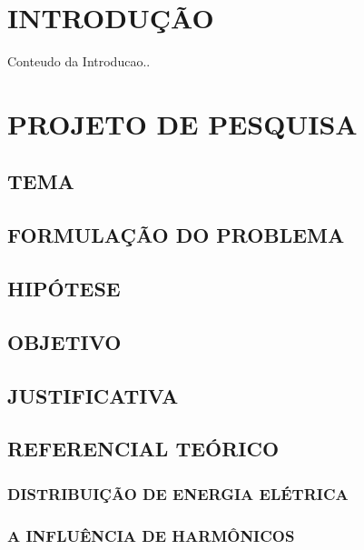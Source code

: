 \documentclass[
	12pt,				%
	openright,			%
	oneside,			%
	a4paper,			%
	chapter=TITLE,		%
	english,			%
	french,				%
	spanish,			%
	brazil,				%
	article,			%
	]{uea-abntex2}
\begin{document}
\chapter*{\vspace*{3.4cm}INTRODUÇÃO}

Conteudo da Introducao..
\newpage
\chapter*{\vspace*{3.4cm}PROJETO DE PESQUISA}

\vspace{24pt}
\section{TEMA}

\section{FORMULAÇÃO DO PROBLEMA}

\section{HIPÓTESE}

\section{OBJETIVO}

\section{JUSTIFICATIVA}

\section{REFERENCIAL TEÓRICO}

\subsection{DISTRIBUIÇÃO DE ENERGIA ELÉTRICA}

\subsection{A INFLUÊNCIA DE HARMÔNICOS}
\end{document}
